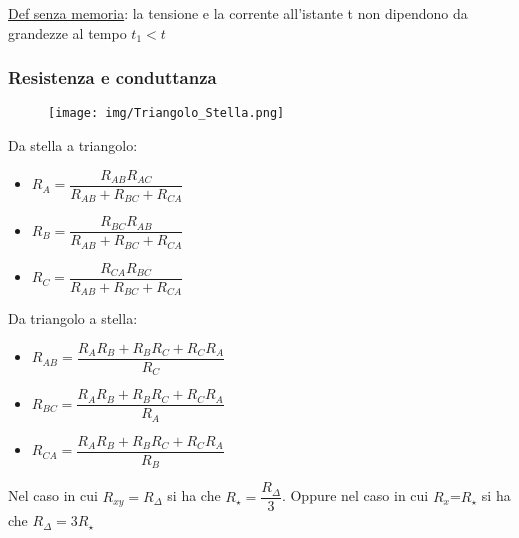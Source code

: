 \documentclass{article}
\begin{document}
\noindent \underline{Def senza memoria}: la tensione e la corrente all'istante t non dipendono da grandezze al tempo $t_1 < t$

\subsubsection{Resistenza e conduttanza}
\medskip
\noindent{}

\begin{figure}[h!]
    \begin{center}
        \texttt{[image: img/Triangolo\_Stella.png]}
    \end{center}
\end{figure}
\noindent Da stella a triangolo:\begin{itemize}
    \item $R_A=\dfrac{R_{AB}R_{AC}}{R_{AB}+R_{BC}+R_{CA}} $
    \item $R_B=\dfrac{R_{BC}R_{AB}}{R_{AB}+R_{BC}+R_{CA}} $
    \item $R_C=\dfrac{R_{CA}R_{BC}}{R_{AB}+R_{BC}+R_{CA}} $
\end{itemize}

\noindent Da triangolo a stella:\begin{itemize}
    \item $R_{AB}=\dfrac{R_{A}R_{B}+R_{B}R_C+R_{C}R_{A}}{R_C} $
    \item $R_{BC}=\dfrac{R_{A}R_{B}+R_{B}R_C+R_{C}R_{A}}{R_A} $
    \item $R_{CA}=\dfrac{R_{A}R_{B}+R_{B}R_C+R_{C}R_{A}}{R_B} $
\end{itemize}

\noindent Nel caso in cui $R_{xy}=R_{\Delta}$ si ha che $R_{\star}=\dfrac{R_{\Delta}}{3}$. Oppure nel caso in cui $R_x$=$R_{\star}$ si ha che 
$R_{\Delta}=3R_{\star}$
\end{document}
